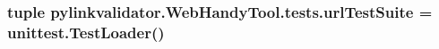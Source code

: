\subsubsection[{url\+Test\+Suite}]{\setlength{\rightskip}{0pt plus 5cm}tuple pylinkvalidator.\+Web\+Handy\+Tool.\+tests.\+url\+Test\+Suite = unittest.\+Test\+Loader()}\hypertarget{namespacepylinkvalidator_1_1_web_handy_tool_1_1tests_acf8bf6dfdff5780f67938a68973a60c8}{}\label{namespacepylinkvalidator_1_1_web_handy_tool_1_1tests_acf8bf6dfdff5780f67938a68973a60c8}
